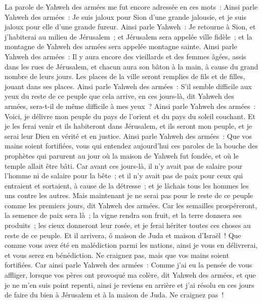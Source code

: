 \begin{multicols}{2}
\VerseOne{}La parole de Yahweh des armées me fut encore adressée en ces mots~:
Ainsi parle Yahweh des armées~: Je suis jaloux pour Sion d'une grande jalousie, et je suis jaloux pour elle d'une grande fureur.
Ainsi parle Yahweh~: Je retourne à Sion, et j'habiterai au milieu de Jérusalem~; et Jérusalem sera appelée ville fidèle~; et la montagne de Yahweh des armées sera appelée montagne sainte.
Ainsi parle Yahweh des armées~: Il y aura encore des vieillards et des femmes âgées, assis dans les rues de Jérusalem, et chacun aura son bâton à la main, à cause du grand nombre de leurs jours.
Les places de la ville seront remplies de fils et de filles, jouant dans ses places.
Ainsi parle Yahweh des armées~: S'il semble difficile aux yeux du reste de ce peuple que cela arrive, en ces jours-là, dit Yahweh des armées, sera-t-il de même difficile à mes yeux~?
Ainsi parle Yahweh des armées~: Voici, je délivre mon peuple du pays de l'orient et du pays du soleil couchant.
Et je les ferai venir et ils habiteront dans Jérusalem, et ils seront mon peuple, et je serai leur Dieu en vérité et en justice.
Ainsi parle Yahweh des armées~: Que vos mains soient fortifiées, vous qui entendez aujourd'hui ces paroles de la bouche des prophètes qui parurent au jour où la maison de Yahweh fut fondée, et où le temple allait être bâti.
Car avant ces jours-là, il n'y avait pas de salaire pour l'homme ni de salaire pour la bête~; et il n'y avait pas de paix pour ceux qui entraient et sortaient, à cause de la détresse~; et je lâchais tous les hommes les uns contre les autres.
Mais maintenant je ne serai pas pour le reste de ce peuple comme les premiers jours, dit Yahweh des armées.
Car les semailles prospéreront, la semence de paix sera là~; la vigne rendra son fruit, et la terre donnera ses produits~; les cieux donneront leur rosée, et je ferai hériter toutes ces choses au reste de ce peuple.
Et il arrivera, ô maison de Juda et maison d'Israël~! Que comme vous avez été en malédiction parmi les nations, ainsi je vous en délivrerai, et vous serez en bénédiction. Ne craignez pas, mais que vos mains soient fortifiées.
Car ainsi parle Yahweh des armées~: Comme j'ai eu la pensée de vous affliger, lorsque vos pères ont provoqué ma colère, dit Yahweh des armées, et que je ne m'en suis point repenti,
ainsi je reviens en arrière et j'ai résolu en ces jours de faire du bien à Jérusalem et à la maison de Juda. Ne craignez pas~!

\end{multicols}

